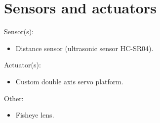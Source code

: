 \section{Sensors and actuators}

\begin{frame}{\secname}
	Sensor(s):
	\begin{itemize}
		\item Distance sensor (ultrasonic sensor HC-SR04).
	\end{itemize}

	Actuator(s):
	\begin{itemize}
		\item Custom double axis servo platform.
	\end{itemize}

	Other:
	\begin{itemize}
		\item Fisheye lens.
	\end{itemize}
\end{frame}
